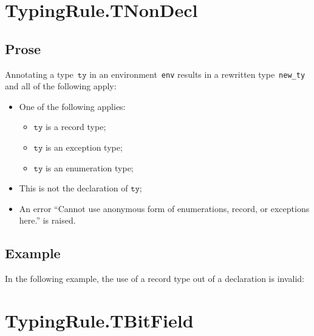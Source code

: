 \documentclass{book}
\newcommand\tty[0]{\texttt{ty}}
\begin{document}
\begin{itemize}




\section{TypingRule.TNonDecl \label{sec:TypingRule.TNonDecl}}

\subsection{Prose}
Annotating a type~$\tty$ in an environment~\texttt{env} results in a
rewritten type~\texttt{new\_ty} and all of the following apply:
\begin{itemize}
  \item One of the following applies:
    \begin{itemize}
      \item $\tty$ is a record type;
      \item $\tty$ is an exception type;
      \item $\tty$ is an enumeration type;
    \end{itemize}
  \item This is not the declaration of $\tty$;
  \item An error ``Cannot use anonymous form of enumerations, record, or exceptions here.'' is raised.
\end{itemize}

\subsection{Example}

In the following example, the use of a record type out of a declaration is invalid:






\section{TypingRule.TBitField \label{sec:TypingRule.TBitField}}


\end{itemize}
\end{document}
